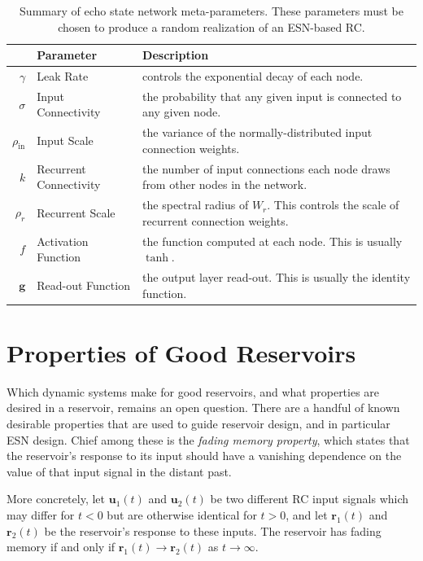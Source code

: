 \begin{table}
  \caption{Summary of echo state network meta-parameters. These
    parameters must be chosen to produce a random realization of an
    ESN-based RC.}
  \begin{tabularx}{\linewidth}{rlX}
    & Parameter & Description \\
    \hline
    \rule{0pt}{4ex}
    $\gamma$ & Leak Rate & controls the exponential decay of each node. \\
    \rule{0pt}{4ex}
    $\sigma$ & Input Connectivity & the probability that any given input is connected to any given node. \\
    \rule{0pt}{4ex}
    $\rho_\text{in}$ & Input Scale & the variance of the normally-distributed input connection weights. \\
    \rule{0pt}{4ex}
    $k$ & Recurrent Connectivity & the number of input connections each node draws from other nodes in the network. \\
    \rule{0pt}{4ex}
    $\rho_r$ & Recurrent Scale & the spectral radius of $W_r$. This controls the scale of recurrent connection weights. \\
    \rule{0pt}{4ex}
    $f$ & Activation Function & the function computed at each node. This is usually $\tanh$. \\
    \rule{0pt}{4ex}
    $\bm{g}$ & Read-out Function & the output layer read-out. This is usually the identity function. \\
  \end{tabularx}
  \label{tab:esn-metaparameters}
\end{table}

\section{Properties of Good Reservoirs}\label{sec:reservoir-properties}

Which dynamic systems make for good reservoirs, and what properties
are desired in a reservoir, remains an open question. There are a
handful of known desirable properties that are used to guide reservoir
design, and in particular ESN design. Chief among these is the
\emph{fading memory property}, which states that the reservoir's
response to its input should have a vanishing dependence on the value
of that input signal in the distant past.\cite{jaeger2001,jaeger2002}

More concretely, let $\bm{u}_1(t)$ and $\bm{u}_2(t)$ be two different
RC input signals which may differ for $t < 0$ but are otherwise
identical for $t > 0$, and let $\bm{r}_1(t)$ and $\bm{r}_2(t)$ be the
reservoir's response to these inputs. The reservoir has fading memory
if and only if $\bm{r}_1(t) \rightarrow \bm{r}_2(t)$ as $t \rightarrow \infty$.

